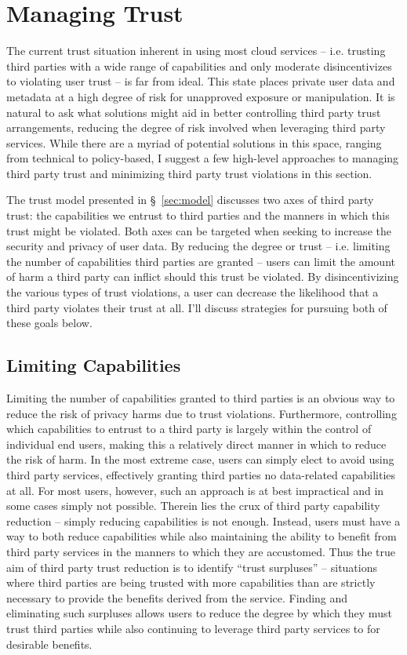\section{Managing Trust}
\label{sec:mitigation}

The current trust situation inherent in using most cloud services --
i.e. trusting third parties with a wide range of capabilities and only
moderate disincentivizes to violating user trust -- is far from
ideal. This state places private user data and metadata at a high
degree of risk for unapproved exposure or manipulation. It is natural
to ask what solutions might aid in better controlling third party
trust arrangements, reducing the degree of risk involved when
leveraging third party services. While there are a myriad of potential
solutions in this space, ranging from technical to policy-based, I
suggest a few high-level approaches to managing third party trust and
minimizing third party trust violations in this section.

The trust model presented in \S~\ref{sec:model} discusses two axes of
third party trust: the capabilities we entrust to third parties and
the manners in which this trust might be violated. Both axes can be
targeted when seeking to increase the security and privacy of user
data. By reducing the degree or trust -- i.e. limiting the number of
capabilities third parties are granted -- users can limit the amount
of harm a third party can inflict should this trust be violated. By
disincentivizing the various types of trust violations, a user can
decrease the likelihood that a third party violates their trust at
all. I'll discuss strategies for pursuing both of these goals below.

\subsection{Limiting Capabilities}
\label{sec:mitigation:capabilities}

Limiting the number of capabilities granted to third parties is an
obvious way to reduce the risk of privacy harms due to trust
violations. Furthermore, controlling which capabilities to entrust to
a third party is largely within the control of individual end users,
making this a relatively direct manner in which to reduce the risk of
harm. In the most extreme case, users can simply elect to avoid using
third party services, effectively granting third parties no
data-related capabilities at all. For most users, however, such an
approach is at best impractical and in some cases simply not
possible. Therein lies the crux of third party capability reduction --
simply reducing capabilities is not enough. Instead, users must have a
way to both reduce capabilities while also maintaining the ability to
benefit from third party services in the manners to which they are
accustomed. Thus the true aim of third party trust reduction is to
identify ``trust surpluses'' -- situations where third parties are
being trusted with more capabilities than are strictly necessary to
provide the benefits derived from the service. Finding and eliminating
such surpluses allows users to reduce the degree by which they must
trust third parties while also continuing to leverage third party
services to for desirable benefits.

